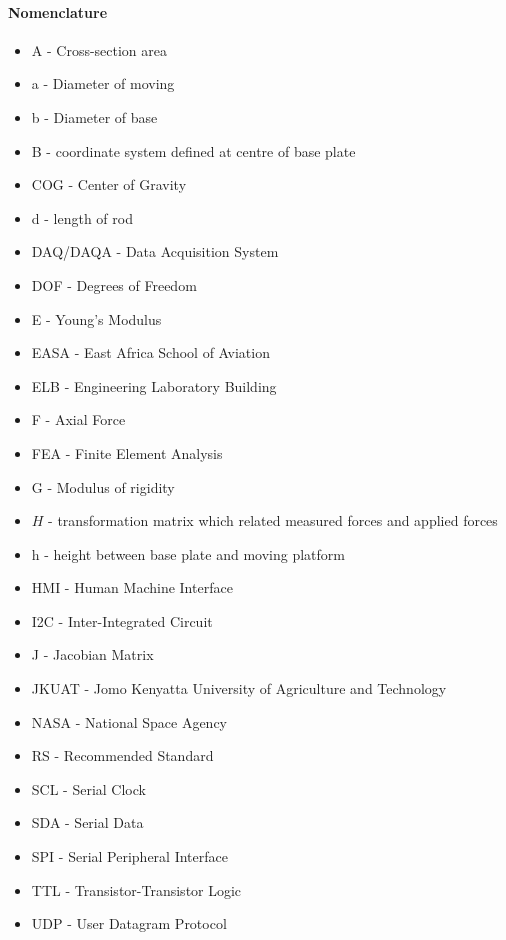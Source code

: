 \paragraph{Nomenclature}
\begin{itemize}
\item A - Cross-section area
\item a - Diameter of moving 
\item b - Diameter of base
\item B - coordinate system defined at centre of base plate
\item COG - Center of Gravity
\item d - length of rod
\item DAQ/DAQA - Data Acquisition System
\item DOF - Degrees of Freedom
\item E - Young's Modulus
\item EASA - East Africa School of Aviation
\item ELB - Engineering Laboratory Building
\item F - Axial Force
\item FEA - Finite Element Analysis
\item G - Modulus of rigidity
\item $H$ - transformation matrix which related measured forces and applied forces
\item h - height between base plate and moving platform
\item HMI - Human Machine Interface 
\item I2C - Inter-Integrated Circuit 
\item J - Jacobian Matrix 
\item JKUAT - Jomo Kenyatta University of Agriculture and Technology
\item NASA - National Space Agency
\item RS - Recommended Standard
\item SCL - Serial Clock
\item SDA - Serial Data
\item SPI - Serial Peripheral Interface
\item TTL - Transistor-Transistor Logic
\item UDP - User Datagram Protocol
\end{itemize}
\pagebreak
